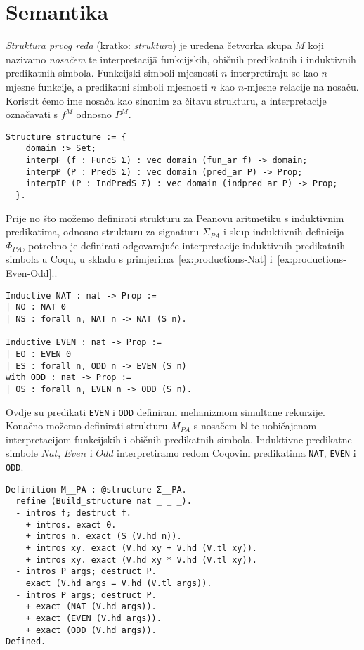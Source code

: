 \section{Semantika}\label{sec:semantika}
\begin{definition}
  \textit{Struktura prvog reda} (kratko: \textit{struktura}) je uređena četvorka skupa \(M\) koji nazivamo \textit{nosačem}
  te interpretacij\=a funkcijskih, običnih predikatnih i induktivnih predikatnih simbola.
  Funkcijski simboli mjesnosti \(n\) interpretiraju se kao \(n\)-mjesne funkcije, a predikatni simboli mjesnosti \(n\) kao \(n\)-mjesne relacije na nosaču.
  Koristit ćemo ime nosača kao sinonim za čitavu strukturu,
  a interpretacije označavati s \(f^{M}\) odnosno \(P^{M}\).
\begin{verbatim}
Structure structure := {
    domain :> Set;
    interpF (f : FuncS Σ) : vec domain (fun_ar f) -> domain;
    interpP (P : PredS Σ) : vec domain (pred_ar P) -> Prop;
    interpIP (P : IndPredS Σ) : vec domain (indpred_ar P) -> Prop;
  }.
\end{verbatim}
\end{definition}

\begin{example}\label{ex:structure}
  Prije no što možemo definirati strukturu za Peanovu aritmetiku s induktivnim predikatima,
  odnosno strukturu za signaturu \(\Sigma_{\mathit{PA}}\) i skup induktivnih definicija \(\Phi_{\mathit{PA}}\),
  potrebno je definirati odgovarajuće interpretacije induktivnih predikatnih simbola u Coqu, u skladu s primjerima~\ref{ex:productions-Nat} i~\ref{ex:productions-Even-Odd}..
\begin{verbatim}
Inductive NAT : nat -> Prop :=
| NO : NAT 0
| NS : forall n, NAT n -> NAT (S n).

Inductive EVEN : nat -> Prop :=
| EO : EVEN 0
| ES : forall n, ODD n -> EVEN (S n)
with ODD : nat -> Prop :=
| OS : forall n, EVEN n -> ODD (S n).
\end{verbatim}
  \noindent Ovdje su predikati \texttt{EVEN} i \texttt{ODD} definirani mehanizmom simultane rekurzije.\\
  \noindent Konačno možemo definirati strukturu \(M_{\mathit{PA}}\) s nosačem \(\mathbb{N}\) te uobičajenom interpretacijom
  funkcijskih i običnih predikatnih simbola. Induktivne predikatne simbole
  \(\mathit{Nat}\), \(\mathit{Even}\) i \(\mathit{Odd}\)
  interpretiramo redom Coqovim predikatima \texttt{NAT}, \texttt{EVEN} i \texttt{ODD}.
\begin{verbatim}
Definition M__PA : @structure Σ__PA.
  refine (Build_structure nat _ _ _).
  - intros f; destruct f.
    + intros. exact 0.
    + intros n. exact (S (V.hd n)).
    + intros xy. exact (V.hd xy + V.hd (V.tl xy)).
    + intros xy. exact (V.hd xy * V.hd (V.tl xy)).
  - intros P args; destruct P.
    exact (V.hd args = V.hd (V.tl args)).
  - intros P args; destruct P. 
    + exact (NAT (V.hd args)).
    + exact (EVEN (V.hd args)).
    + exact (ODD (V.hd args)).
Defined.
\end{verbatim}
\end{example}

